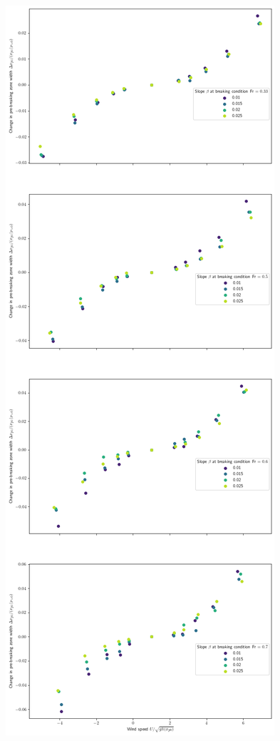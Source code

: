 \documentclass[10pt,a4paper]{article}
\begin{document}
\includegraphics[scale=0.35]{Fig7.png}
\end{document}
